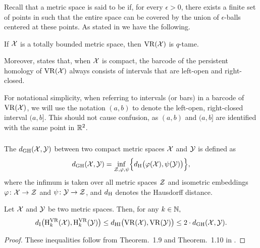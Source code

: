 \subsubsection{}
\label{sss:q-tameness}

Recall that a metric space is said to be  if, for every $\epsilon > 0$, there exists a finite set of points in such that the entire space can be covered by the union of $\epsilon$-balls centered at these points.
As stated in \cite[Prop.~5.1]{chazal2014geometric} we have the following.

\medskip\lemma
If $\cX$ is a totally bounded metric space, then $\VR(\cX)$ is $q$-tame.
\medskip

Moreover, \cite[Thm.~5.2]{lim2020vietoris} states that, when $\cX$ is compact, the barcode of the persistent homology of $\VR(\cX)$ always consists of intervals that are left-open and right-closed.

For notational simplicity, when referring to intervals (or bars) in a barcode of $\VR(\cX)$, we will use the notation $(a, b)$ to denote the left-open, right-closed interval $(a, b]$.
This should not cause confusion, as $(a, b)$ and $(a, b]$ are identified with the same point in $\R^2$.


\subsubsection{}\label{thm:stability-HI}

The  $\dgh(\cX, \cY)$ between two compact metric spaces $\cX$ and $\cY$ is defined as
\[
\dgh(\cX, \cY) = \inf_{\cZ, \varphi, \psi} \set[\Big]{d_\rH\big(\varphi(\cX), \psi(\cY)\big)},
\]
where the infimum is taken over all metric spaces $\cZ$ and isometric embeddings $\varphi \colon \cX \to \cZ$ and $\psi \colon \cY \to \cZ$, and $d_\rH$ denotes the Hausdorff distance.

\medskip\theorem Let $\cX$ and $\cY$ be two metric spaces.
Then, for any $k \in \N,$
\[
\di\big(\rH_k^\VR(\cX), \rH_k^\VR(\cY)\big) \leq
\dhi\big(\VR(\cX), \VR(\cY)\big) \leq
2 \cdot \dgh(\cX, \cY).
\]

\begin{proof}
	These inequalities follow from Theorem.~1.9 and Theorem.~1.10 in \cite{blumberg2023interleaving}.
\end{proof}